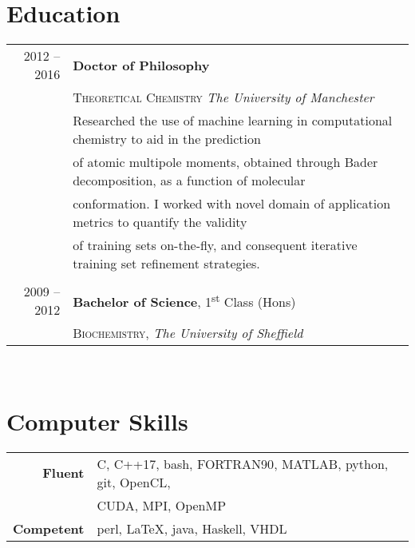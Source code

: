 \documentclass[11pt]{article} %
\begin{document}
\section{Education} 

\begin{tabular}{rl} %

2012 -- 2016 & \textbf{Doctor of Philosophy} \\ 
& \textsc{Theoretical Chemistry} \textit{The University of Manchester}\\
&Researched the use of machine learning in computational chemistry to aid in the prediction\\ 
&of atomic multipole moments, obtained through Bader decomposition, as a function of molecular\\
&conformation. I worked with novel domain of application metrics to quantify the validity\\
&of training sets on-the-fly, and consequent iterative training set refinement strategies.\\
&\\

2009 -- 2012 & \textbf{Bachelor of Science}, 1\textsuperscript{st} Class (Hons)\\ 
& \textsc{Biochemistry}, \textit{The University of Sheffield}\\

\end{tabular}\\[10pt]

\section{Computer Skills} 

\begin{tabular}{rl}
\textbf{Fluent}
&C, C++17, bash, \textsc{FORTRAN90}, MATLAB, python, git, OpenCL,\\ 
&CUDA, MPI, OpenMP\\ 
\textbf{Competent}
& perl, \LaTeX, java, Haskell, VHDL\\
\end{tabular}
\\

\newpage
\end{document}
